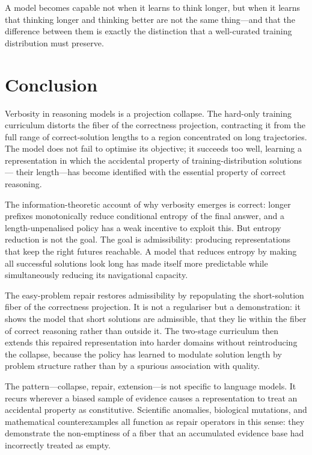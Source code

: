 \documentclass[11pt]{article}
\theoremstyle{rthm}
\theoremstyle{rdef}
\theoremstyle{remark}
\begin{document}
A model becomes capable not when it learns to think longer, but when
it learns that thinking longer and thinking better are not the same
thing---and that the difference between them is exactly the
distinction that a well-curated training distribution must preserve.

\section{Conclusion}
\label{sec:conclusion}

Verbosity in reasoning models is a projection collapse. The hard-only
training curriculum distorts the fiber of the correctness projection,
contracting it from the full range of correct-solution lengths to a
region concentrated on long trajectories. The model does not fail to
optimise its objective; it succeeds too well, learning a representation
in which the accidental property of training-distribution solutions---
their length---has become identified with the essential property of
correct reasoning.

The information-theoretic account of why verbosity emerges is correct:
longer prefixes monotonically reduce conditional entropy of the final
answer, and a length-unpenalised policy has a weak incentive to exploit
this. But entropy reduction is not the goal. The goal is admissibility:
producing representations that keep the right futures reachable. A
model that reduces entropy by making all successful solutions look long
has made itself more predictable while simultaneously reducing its
navigational capacity.

The easy-problem repair restores admissibility by repopulating the
short-solution fiber of the correctness projection. It is not a
regulariser but a demonstration: it shows the model that short
solutions are admissible, that they lie within the fiber of correct
reasoning rather than outside it. The two-stage curriculum then
extends this repaired representation into harder domains without
reintroducing the collapse, because the policy has learned to
modulate solution length by problem structure rather than by a
spurious association with quality.

The pattern---collapse, repair, extension---is not specific to
language models. It recurs wherever a biased sample of evidence
causes a representation to treat an accidental property as
constitutive. Scientific anomalies, biological mutations, and
mathematical counterexamples all function as repair operators
in this sense: they demonstrate the non-emptiness of a fiber
that an accumulated evidence base had incorrectly treated as empty.
\end{document}
